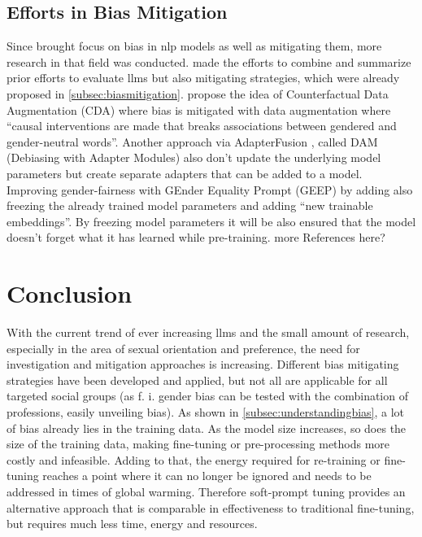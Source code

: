 \subsection{Efforts in Bias Mitigation}
Since \citet{bolukbasi} brought focus on bias in \acrshort{nlp} models as well as mitigating them, more research in that field was conducted. \citet{biassurvey} made the efforts to combine and summarize prior efforts to evaluate \acrshort{llms} but also mitigating strategies, which were already proposed in \autoref{subsec:biasmitigation}. 
\citet{lu2019gender} propose the idea of Counterfactual Data Augmentation (CDA) where bias is mitigated with data augmentation where \enquote{causal interventions are made that breaks associations between gendered and gender-neutral words}. 
Another approach via AdapterFusion \citep{kumar2023parameterefficient}, called DAM (Debiasing with Adapter Modules) also don't update the underlying model parameters but create separate adapters that can be added to a model. 
Improving gender-fairness with GEnder Equality Prompt (GEEP) by adding also freezing the already trained model parameters and adding \enquote{new trainable embeddings}. By freezing model parameters it will be also ensured that the model doesn't forget what it has learned while pre-training.
\textcolor{bhtRed}{more References here?}


\section{Conclusion}
With the current trend of ever increasing \acrshort{llms} and the small amount of research, especially in the area of sexual orientation and preference, the need for investigation and mitigation approaches is increasing. Different bias mitigating strategies have been developed and applied, but not all are applicable for all targeted social groups (as f. i. gender bias can be tested with the combination of professions, easily unveiling bias). As shown in \autoref{subsec:understandingbias}, a lot of bias already lies in the training data. As the model size increases, so does the size of the training data, making fine-tuning or pre-processing methods more costly and infeasible. Adding to that, the energy required for re-training or fine-tuning reaches a point where it can no longer be ignored and needs to be addressed in times of global warming. Therefore soft-prompt tuning provides an alternative approach that is comparable in effectiveness to traditional fine-tuning, but requires much less time, energy and resources.

